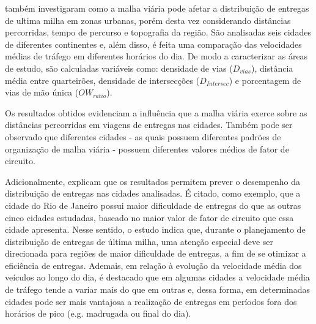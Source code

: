  também investigaram como a malha viária pode afetar a distribuição de entregas de ultima milha em zonas urbanas, porém desta vez considerando distâncias percorridas, tempo de percurso e topografia da região.
%
São analisadas seis cidades de diferentes continentes e, além disso, é feita uma comparação das velocidades médias de tráfego em diferentes horários do dia.
%
De modo a caracterizar as áreas de estudo, são calculadas variáveis como: densidade de vias ($D_{vias}$), distância média entre quarteirões, densidade de intersecções ($D_{Intersec}$) e porcentagem de vias de mão única ($OW_{ratio}$).

Os resultados obtidos evidenciam a influência que a malha viária exerce sobre as distâncias percorridas em viagens de entregas nas cidades.
%
Também pode ser observado que diferentes cidades - as quais possuem diferentes padrões de organização de malha viária - possuem diferentes valores médios de fator de circuito.

Adicionalmente,  explicam que os resultados permitem prever o desempenho da distribuição de entregas nas cidades analisadas. 
%
É citado, como exemplo, que a cidade do Rio de Janeiro possui maior dificuldade de entregas do que as outras cinco cidades estudadas, baseado no maior valor de fator de circuito que essa cidade apresenta.
%
Nesse sentido, o estudo indica que, durante o planejamento de distribuição de entregas de última milha, uma atenção especial deve ser direcionada para regiões de maior dificuldade de entregas, a fim de se otimizar a eficiência de entregas.
%
Ademais, em relação à evolução da velocidade média dos veículos ao longo do dia, é destacado que em algumas cidades a velocidade média de tráfego tende a variar mais do que em outras e, dessa forma, em determinadas cidades pode ser mais vantajosa a realização de entregas em períodos fora dos horários de pico (e.g. madrugada ou final do dia).  

